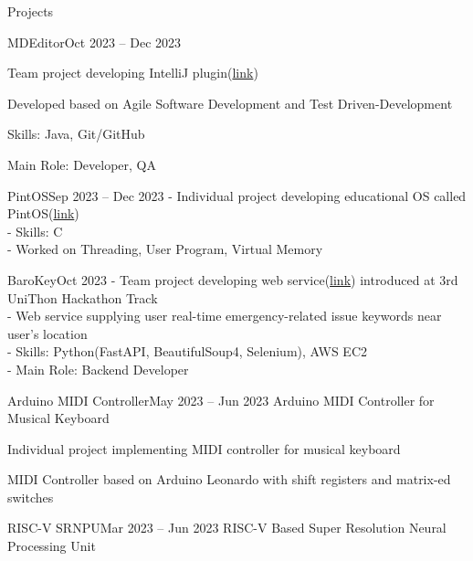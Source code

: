 \documentclass{resume}
\begin{document}
\begin{rSection}{Projects}
\begin{rSubsection}{MDEditor}{Oct 2023 -- Dec 2023}
        \item Team project developing IntelliJ plugin(\href{https://github.com/minsusun/csed332-project}{link})

        \item Developed based on Agile Software Development and Test Driven-Development

        \item Skills: Java, Git/GitHub

        \item Main Role: Developer, QA
    \end{rSubsection}
    
    \begin{rSubsection}{PintOS}{Sep 2023 -- Dec 2023}
        - Individual project developing educational OS called PintOS(\href{https://github.com/minsusun/csed312-pintos}{link}) \\
        - Skills: C \\
        - Worked on Threading, User Program, Virtual Memory
    \end{rSubsection}
    
    \begin{rSubsection}{BaroKey}{Oct 2023}
        - Team project developing web service(\href{https://github.com/UniD3-Hackathon-Team4/barokey}{link}) introduced at 3rd UniThon Hackathon Track \\
        - Web service supplying user real-time emergency-related issue keywords near user's location \\
        - Skills: Python(FastAPI, BeautifulSoup4, Selenium), AWS EC2 \\
        - Main Role: Backend Developer
    \end{rSubsection}

    \begin{rSubsection}{Arduino MIDI Controller}{May 2023 -- Jun 2023}
        Arduino MIDI Controller for Musical Keyboard

        \item Individual project implementing MIDI controller for musical keyboard

        \item MIDI Controller based on Arduino Leonardo with shift registers and matrix-ed switches
    \end{rSubsection}

    \begin{rSubsection}{RISC-V SRNPU}{Mar 2023 -- Jun 2023}
        RISC-V Based Super Resolution Neural Processing Unit


\end{rSubsection}
\end{rSection}
\end{document}
